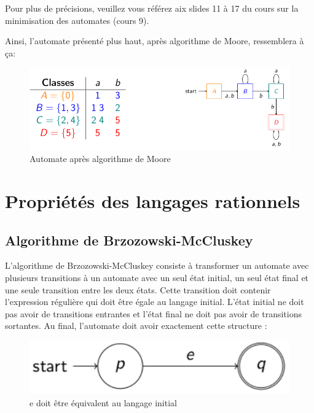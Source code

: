 \documentclass{article}
\begin{document}
Pour plus de précisions, veuillez vous référez aix slides 11 à 17 du cours sur la minimisation des automates (cours 9).

Ainsi, l'automate présenté plus haut, après algorithme de Moore, ressemblera à ça:
\begin{figure}[h]
	\centering
	\includegraphics[scale=0.3]{indistagable2.png}
	\caption{Automate après algorithme de Moore}
\end{figure}

\newpage
















\section{Propriétés des langages rationnels}
\subsection{Algorithme de Brzozowski-McCluskey}
L'algorithme de Brzozowski-McCluskey consiste à transformer un automate avec plusieurs transitions à un automate avec un seul état initial, un seul état final et une seule transition entre les deux états. Cette transition doit contenir l'expression régulière qui doit être égale au langage initial. L'état initial ne doit pas avoir de transitions entrantes et l'état final ne doit pas avoir de transitions sortantes. Au final, l'automate doit avoir exactement cette structure :
\begin{figure}[h]
    \centering
    \includegraphics[scale=0.5]{Image17.png}
    \caption{e doit être équivalent au langage initial}
\end{figure}
\end{document}
